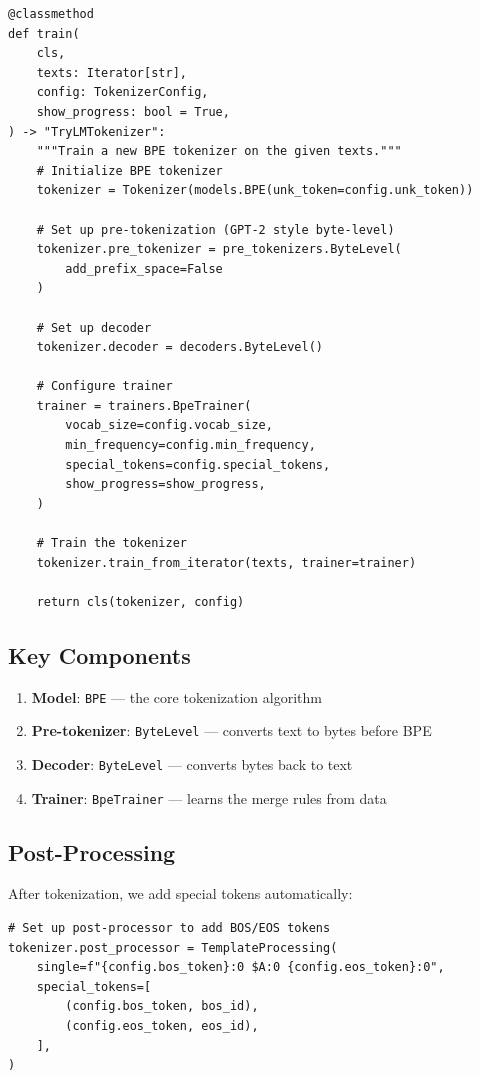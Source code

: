\begin{lstlisting}[style=python, caption={Tokenizer training from tokenizer.py}]
@classmethod
def train(
    cls,
    texts: Iterator[str],
    config: TokenizerConfig,
    show_progress: bool = True,
) -> "TryLMTokenizer":
    """Train a new BPE tokenizer on the given texts."""
    # Initialize BPE tokenizer
    tokenizer = Tokenizer(models.BPE(unk_token=config.unk_token))

    # Set up pre-tokenization (GPT-2 style byte-level)
    tokenizer.pre_tokenizer = pre_tokenizers.ByteLevel(
        add_prefix_space=False
    )

    # Set up decoder
    tokenizer.decoder = decoders.ByteLevel()

    # Configure trainer
    trainer = trainers.BpeTrainer(
        vocab_size=config.vocab_size,
        min_frequency=config.min_frequency,
        special_tokens=config.special_tokens,
        show_progress=show_progress,
    )

    # Train the tokenizer
    tokenizer.train_from_iterator(texts, trainer=trainer)

    return cls(tokenizer, config)
\end{lstlisting}

\subsection{Key Components}

\begin{enumerate}
    \item \textbf{Model}: \texttt{BPE} --- the core tokenization algorithm
    \item \textbf{Pre-tokenizer}: \texttt{ByteLevel} --- converts text to bytes before BPE
    \item \textbf{Decoder}: \texttt{ByteLevel} --- converts bytes back to text
    \item \textbf{Trainer}: \texttt{BpeTrainer} --- learns the merge rules from data
\end{enumerate}

\subsection{Post-Processing}

After tokenization, we add special tokens automatically:

\begin{lstlisting}[style=python]
# Set up post-processor to add BOS/EOS tokens
tokenizer.post_processor = TemplateProcessing(
    single=f"{config.bos_token}:0 $A:0 {config.eos_token}:0",
    special_tokens=[
        (config.bos_token, bos_id),
        (config.eos_token, eos_id),
    ],
)
\end{lstlisting}

